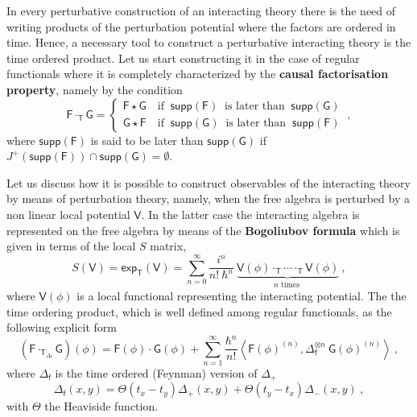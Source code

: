 \documentclass[11pt]{book}
\newcommand{\supp}{\mathsf{supp}}
\renewcommand{\exp}{\mathsf{exp}}
\newcommand{\sm}[1]{\left\langle#1\right\rangle}
\newcommand{\Fsf}{\mathsf{F}}
\newcommand{\Gsf}{\mathsf{G}}
\newcommand{\Tsf}{\mathsf{T}}
\newcommand{\Vsf}{\mathsf{V}}
\newcommand{\fsf}{\mathsf{f}}
\theoremstyle{break}
\begin{document}
In every perturbative construction of an interacting theory there is the need of writing products of the perturbation potential where the factors are ordered in time. Hence, a necessary tool to construct a perturbative interacting theory is the time ordered product. Let us start constructing it in the case of regular functionals where it is completely characterized by the \textbf{causal factorisation property}, namely by the condition
%
\begin{equation}
\Fsf \cdot_\Tsf \Gsf = 
\left\{
\begin{array}{ll}
\Fsf \star \Gsf \quad \mbox{if } \ \supp(\Fsf) \ \mbox{ is later than  } \ \supp(\Gsf)  \\
\Gsf \star \Fsf \quad \mbox{if } \ \supp(\Gsf) \ \mbox{ is later than  } \ \supp(\Fsf) 
\end{array}
\right. \ ,
\label{eq:causal_factorization}
\end{equation}
%
where $\supp(\Fsf)$ is said to be  later than   $\supp(\Gsf)$ if $J^+(\supp(\Fsf)) \cap \supp(\Gsf)=\emptyset$.


Let us discuss how it is possible to construct observables of the interacting theory by means of perturbation theory, namely, when the free algebra is perturbed by a non linear local potential $\Vsf$. In the latter case the interacting algebra is represented on the free algebra by means of the \textbf{Bogoliubov formula} which is given in terms of the local $S$ matrix, 
%
\begin{equation}
S(\Vsf) = \exp_\Tsf\left(\Vsf\right) = \sum^\infty_{n=0} \frac{i^n}{n!\ \hbar^n} \ \underbrace{\Vsf(\phi) \cdot_\Tsf \cdots \cdot_\Tsf \Vsf(\phi)}_{n \mbox{ times }} \ , 
\label{eq:S_matrix}
\end{equation}
%
where $\Vsf(\phi)$ is a local functional representing the interacting potential. The the time ordering product, which is well defined among regular functionals, as the following explicit form
%
\begin{equation}
(\Fsf \cdot_{\Tsf_{\Delta_\fsf}}  \Gsf)(\phi) = \Fsf(\phi) \cdot \Gsf(\phi) + \sum_{n=1}^\infty \frac{\hbar^n}{n!} \sm{ \Fsf(\phi)^{(n)} , \Delta_\fsf^{\otimes n} \ \Gsf(\phi)^{(n)} } \ ,
\label{eq:time_ordered_prod}
\end{equation}
%
where $\Delta_\fsf$ is the time ordered (Feynman) version of $\Delta_+$
%
\begin{equation*}
\Delta_\fsf(x,y) = \Theta(t_x-t_y) \Delta_+(x,y) + \Theta(t_y-t_x) \Delta_-(x,y) \ ,
\end{equation*}
%
with $\Theta$ the Heaviside function. 
\end{document}
